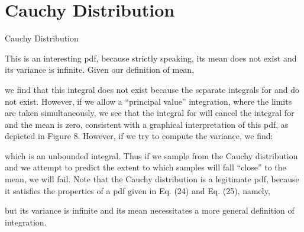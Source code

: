 \section{Cauchy Distribution}
% 
Cauchy Distribution

 

This is an interesting pdf, because strictly speaking, its mean does not exist and its variance is infinite. Given our definition of mean,

 

we find that this integral does not exist because the separate integrals for   and  do not exist. However, if we allow a ``principal value'' integration, where the limits are taken simultaneously, we see that the integral for  will cancel the integral for  and the mean is zero, consistent with a graphical interpretation of this pdf, as depicted in Figure 8. However, if we try to compute the variance, we find:

 

which is an unbounded integral. Thus if we sample from the Cauchy distribution and we attempt to predict the extent to which samples will fall ``close'' to the mean, we will fail. Note that the Cauchy distribution is a legitimate pdf, because it satisfies the properties of a pdf given in Eq. (24) and Eq. (25), namely,





but its variance is infinite and its mean necessitates a more general definition of integration.




